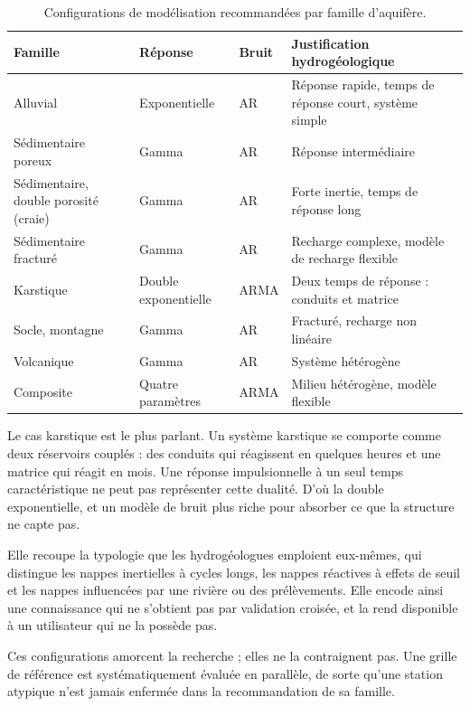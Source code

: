 \begin{table}[H]
\centering
\caption{Configurations de modélisation recommandées par famille d'aquifère.}
\label{tab:familles-aquiferes}
\begin{tabularx}{\textwidth}{@{}L{2.9cm}llY@{}}
\toprule
\textbf{Famille} & \textbf{Réponse} & \textbf{Bruit} & \textbf{Justification hydrogéologique} \\
\midrule
Alluvial & Exponentielle & AR & Réponse rapide, temps de réponse court, système simple \\
Sédimentaire poreux & Gamma & AR & Réponse intermédiaire \\
Sédimentaire, double porosité (craie) & Gamma & AR & Forte inertie, temps de réponse long \\
Sédimentaire fracturé & Gamma & AR & Recharge complexe, modèle de recharge flexible \\
Karstique & Double exponentielle & ARMA & Deux temps de réponse : conduits et matrice \\
Socle, montagne & Gamma & AR & Fracturé, recharge non linéaire \\
Volcanique & Gamma & AR & Système hétérogène \\
Composite & Quatre paramètres & ARMA & Milieu hétérogène, modèle flexible \\
\bottomrule
\end{tabularx}
\end{table}

Le cas karstique est le plus parlant. Un système karstique se comporte comme deux réservoirs
couplés : des conduits qui réagissent en quelques heures et une matrice qui réagit en mois. Une
réponse impulsionnelle à un seul temps caractéristique ne peut pas représenter cette dualité.
D'où la double exponentielle, et un modèle de bruit plus riche pour absorber ce que la
structure ne capte pas.

Elle recoupe la typologie que les hydrogéologues emploient eux-mêmes, qui distingue les nappes
inertielles à cycles longs, les nappes réactives à effets de seuil et les nappes influencées par
une rivière ou des prélèvements. Elle encode ainsi une connaissance qui ne s'obtient pas par
validation croisée, et la rend disponible à un utilisateur qui ne la possède pas.

Ces configurations amorcent la recherche ; elles ne la contraignent pas. Une grille de référence
est systématiquement évaluée en parallèle, de sorte qu'une station atypique n'est jamais
enfermée dans la recommandation de sa famille.

